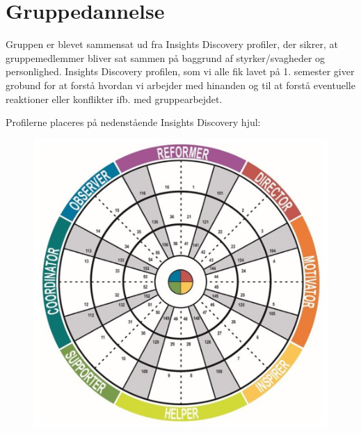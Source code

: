 \chapter{Gruppedannelse}
Gruppen er blevet sammensat ud fra Insights Discovery profiler, der sikrer, at gruppemedlemmer bliver sat sammen på baggrund af styrker/svagheder og personlighed. Insights Discovery profilen, som vi alle fik lavet på 1. semester giver grobund for at forstå hvordan vi arbejder med hinanden og til at forstå eventuelle reaktioner eller konflikter ifb. med gruppearbejdet. 

Profilerne placeres på nedenstående Insights Discovery hjul:

\begin{figure}[h!]
	\centering
	\includegraphics[width=0.5\linewidth]{Gruppedannelse/Insightsdiscovery}
\end{figure}
